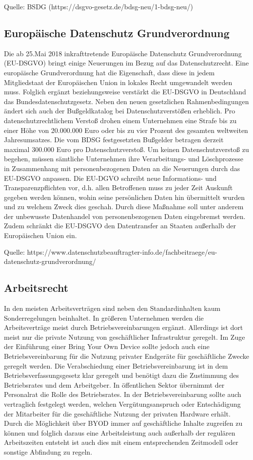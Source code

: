 Quelle: BSDG (https://dsgvo-gesetz.de/bdsg-neu/1-bdsg-neu/)

\subsection{Europäische Datenschutz Grundverordnung}
Die ab 25.Mai 2018 inkrafttretende Europäische Datenschutz Grundverordnung (EU-DSGVO) bringt einige Neuerungen im Bezug auf das Datenschutzrecht. Eine europäische Grundverordnung hat die Eigenschaft, dass diese in jedem Mitgliedstaat der Europäischen Union in lokales Recht umgewandelt werden muss. Folglich ergänzt beziehungsweise verstärkt die EU-DSGVO in Deutschland das Bundesdatenschutzgesetz. Neben den neuen gesetzlichen Rahmenbedingungen ändert sich auch der Bußgeldkatalog bei Datenschutzverstößen erheblich. Pro datenschutzrechtlichem Verstoß drohen einem Unternehmen eine Strafe bis zu einer Höhe von 20.000.000 Euro oder bis zu vier Prozent des gesamten weltweiten Jahresumsatzes. Die vom BDSG festgesetzten Bußgelder betragen derzeit maximal 300.000 Euro pro Datenschutzverstoß.  Um keinen Datenschutzverstoß zu begehen, müssen sämtliche Unternehmen ihre Verarbeitungs- und Löschprozesse in Zusammenhang mit personenbezogenen Daten an die Neuerungen durch das EU-DSGVO anpassen. Die EU-DGVO schreibt neue Informations- und Transparenzpflichten vor, d.h. allen Betroffenen muss zu jeder Zeit Auskunft gegeben werden können, wohin seine persönlichen Daten hin übermittelt wurden und zu welchem Zweck dies geschah. Durch diese Maßnahme soll unter anderem der unbewusste Datenhandel von personenbezogenen Daten eingebremst werden. Zudem schränkt die EU-DSGVO den Datentransfer an Staaten außerhalb der Europäischen Union ein.

Quelle: https://www.datenschutzbeauftragter-info.de/fachbeitraege/eu-datenschutz-grundverordnung/

\subsection{Arbeitsrecht}
In den meisten Arbeitsverträgen sind neben den Standardinhalten kaum Sonderregelungen beinhaltet. In größeren Unternehmen werden die Arbeitsverträge meist durch Betriebsvereinbarungen ergänzt.
Allerdings ist dort meist nur die private Nutzung von geschäftlicher Infrastruktur geregelt. Im Zuge der Einführung einer Bring Your Own Device sollte jedoch auch eine Betriebsvereinbarung für die Nutzung privater Endgeräte für geschäftliche Zwecke geregelt werden. 
Die Verabschiedung einer Betriebsvereinbarung ist in dem Betriebsverfassungsgesetz  klar geregelt und benötigt dazu die Zustimmung des Betriebsrates und dem Arbeitgeber. In öffentlichen Sektor übernimmt der Personalrat die Rolle des Betriebsrates. In der Betriebsvereinbarung sollte auch vertraglich festgelegt werden, welchen Vergütungsanspruch oder Entschädigung der Mitarbeiter für die geschäftliche Nutzung der privaten Hardware erhält. Durch die Möglichkeit über BYOD immer auf geschäftliche Inhalte zugreifen zu können und folglich daraus eine Arbeitsleistung auch außerhalb der regulären Arbeitszeiten entsteht ist auch dies mit einem entsprechenden Zeitmodell oder sonstige Abfindung zu regeln. 

